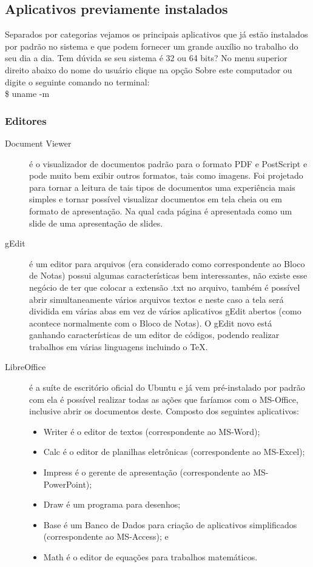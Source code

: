 \subsection{Aplicativos previamente instalados}
Separados por categorias vejamos os principais aplicativos que já estão instalados por padrão no sistema e que podem fornecer um grande auxílio no trabalho do seu dia a dia. Tem dúvida se seu sistema é 32 ou 64 bits? No menu superior direito abaixo do nome do usuário clique na opção Sobre este computador ou digite o seguinte comando no terminal: \\
{\ttfamily\$ uname -m}

\subsubsection{Editores}
\begin{description}
 \item[Document Viewer] é o visualizador de documentos padrão para o formato PDF e PostScript e pode muito bem exibir outros formatos, tais como imagens. Foi projetado para tornar a leitura de tais tipos de documentos uma experiência mais simples e tornar possível visualizar documentos em tela cheia ou em formato de apresentação. Na qual cada página é apresentada como um slide de uma apresentação de slides.
 \item[gEdit] é um editor para arquivos (era considerado como correspondente ao Bloco de Notas) possui algumas características bem interessantes, não existe esse negócio de ter que colocar a extensão .txt no arquivo, também é possível abrir simultaneamente vários arquivos textos e neste caso a tela será dividida em várias abas em vez de vários aplicativos gEdit abertos (como acontece normalmente com o Bloco de Notas). O gEdit novo está ganhando características de um editor de códigos, podendo realizar trabalhos em várias linguagens incluindo o TeX.
 \item[LibreOffice] é a suíte de escritório oficial do Ubuntu e já vem pré-instalado por padrão com ela é possível realizar todas as ações que faríamos com o MS-Office, inclusive abrir os documentos deste. Composto dos seguintes aplicativos:
 \begin{itemize}
  \item Writer é o editor de textos (correspondente ao MS-Word); 
  \item Calc é o editor de planilhas eletrônicas (correspondente ao MS-Excel); 
  \item Impress é o gerente de apresentação (correspondente ao MS-PowerPoint); 
  \item Draw é um programa para desenhos; 
  \item Base é um Banco de Dados para criação de aplicativos simplificados (correspondente ao MS-Access); e 
  \item Math é o editor de equações para trabalhos matemáticos.
 \end{itemize}
\end{description}

